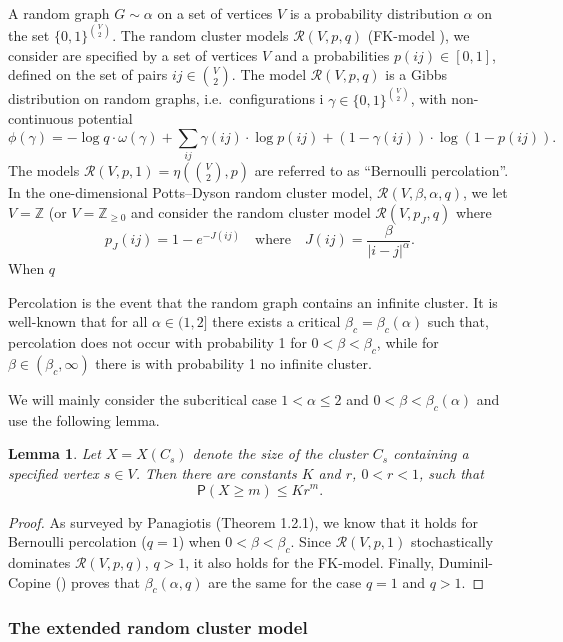 \documentclass[11pt, a4paper]{amsart}
\newtheorem{lem}[thm]{Lemma}
\theoremstyle{definition}
\theoremstyle{remark}
\providecommand{\ZZ}{\mathbb{Z}}
\providecommand{\mscr}{\mathscr}
\renewcommand{\P}{\mathsf{P}}
\providecommand{\w}{\omega}
\begin{document}
A random graph $G\sim\alpha$ on a set of vertices $V$ is a probability
distribution $\alpha$ on the set $\{0,1\}^{\binom V2}$. The random cluster
models $\mscr R(V,p,q)$ (FK-model \cite{grimmet}), we consider are specified by a set 
of vertices $V$ and a probabilities $p(ij)\in[0,1]$, defined on the set of pairs
$ij\in \binom V2$. The model $\mscr R(V,p,q)$ is a Gibbs distribution on random
graphs, i.e.\ configurations i $\gamma\in\{0,1\}^{\binom V2}$, with 
non-continuous potential
$$
\phi(\gamma) = 
- \log q \cdot\w(\gamma) + 
\sum_{ij}\gamma(ij)\cdot \log p(ij) + (1-\gamma(ij))\cdot\log (1-p(ij)).
$$
The models $\mscr R(V,p,1)=\eta(\binom V2,p)$ 
are referred to as ``Bernoulli percolation''. 
In the one-dimensional Potts--Dyson random cluster model, 
$\mscr R(V,\beta,\alpha,q)$,
we let $V=\ZZ$ (or $V=\ZZ_{\ge0}$ and consider the random cluster model 
$\mscr R(V,p_J,q)$ where 
\begin{equation}\label{eq:Jdef}
  p_J(ij) = 1-e^{-J(ij)} \quad\text{where}\quad 
  J({ij}) = \frac \beta{|i-j|^\alpha}.
\end{equation}
When $q$

Percolation is the event that the random graph contains an infinite cluster. 
It is well-known \cite{ACCN} that for all $\alpha\in(1,2]$
there exists a critical $\beta_c=\beta_c(\alpha)$
such that, percolation does not occur with probability 1 for $0<\beta<\beta_c$, 
while for $\beta\in(\beta_c,\infty)$ there is with probability 1
no infinite cluster.     

We will mainly consider the subcritical case $1<\alpha\le 2$ and $0<\beta <\beta_c(\alpha)$ and use the following lemma. 
\begin{lem}\label{geometric-bound}
 Let $X=X(C_s)$ denote the size of the cluster $C_s$ 
 containing a specified vertex $s\in V$. Then there are constants 
 $K$ and $r$, $0<r<1$, such that $$\P(X\ge m)\le K r^{m}. $$ 
\end{lem}
\begin{proof}
  As surveyed by Panagiotis \cite{panagiotis} (Theorem 1.2.1), we know that it
  holds for Bernoulli percolation ($q=1$) when $0<\beta<\beta_c$. Since $\mscr R(V,p,1)$
  stochastically dominates $\mscr R(V,p,q)$, $q>1$, it also holds for the
  FK-model. Finally, Duminil-Copine (\cite{duminil}) proves that $\beta_c(\alpha,q)$ are
  the same for the case $q=1$ and $q>1$.
\end{proof}

\subsubsection{The extended random cluster model}
\end{document}
